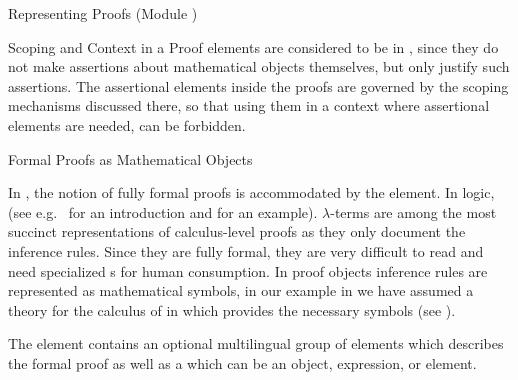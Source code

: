 \begin{omgroup}[id=proofs,short=Representing Proofs]{Representing Proofs (Module {})}
\begin{module}[id=scoping-proofs]
\begin{omgroup}[id=proofs.scoping]{Scoping and Context in a Proof}
{} elements are considered to be
 in {\omdoc}, since they do not make
assertions about mathematical objects themselves, but only justify such assertions.
The assertional elements inside the proofs are governed by the scoping mechanisms
discussed there, so that using them in a context where assertional elements are
needed, can be forbidden. 
\end{omgroup}
\end{module}

\begin{module}[id=proofobjects]
\begin{omgroup}[id=proofobjects]{Formal Proofs as Mathematical Objects}

\begin{omtext}
  In {\omdoc}, the notion of fully formal proofs is accommodated by the
  {} element. In logic,  (see e.g.~\cite{Thompson91} for an introduction and
  {} for an example).  $\lambda$-terms are among the most succinct
  representations of calculus-level proofs as they only document the inference
  rules. Since they are fully formal, they are very difficult to read and need specialized
  {s} for human consumption. In proof objects
  inference rules are represented as mathematical symbols, in our example in
  {} we have assumed a theory {} for the calculus of
  {} in {} which provides the
  necessary symbols (see {}).
\end{omtext}

\begin{definition}[id=proofobject.def]
  The {} element contains an optional multilingual group of
  {} elements which describes the formal proof as well as a
  {} which can be an {\openmath} object, {\cmathml} expression, or
  {} element.
\end{definition}


\end{omgroup}
\end{module}
\end{omgroup}
